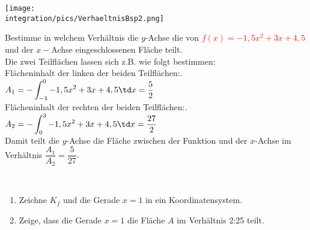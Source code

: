 \begin{minipage}{\textwidth}
	\begin{minipage}{.4\textwidth}
		\texttt{[image: \\integration/pics/VerhaeltnisBsp2.png]}
	\end{minipage}
	\begin{minipage}{.6\textwidth}\raggedright
		Bestimme in welchem Verhältnis die \(y\)-Achse die von \textcolor{red}{\(f(x)=-1,5x^2+3x+4,5\)} und der \(x-\)Achse eingeschlossenen Fläche teilt.\\
		\textcolor{loes}{Die zwei Teilflächen lassen sich z.B. wie folgt bestimmen:}\\
		\textcolor{loes}{Flächeninhalt der linken der beiden Teilflächen:}.\\
		\textcolor{loes}{\(\displaystyle A_1=-\int_{-1}^0 -1,5x^2+3x+4,5 \td x=\frac{5}{2}\)}\\
		\textcolor{loes}{Flächeninhalt der rechten der beiden Teilflächen:}.\\
		\textcolor{loes}{\(\displaystyle A_2=-\int_0^3 -1,5x^2+3x+4,5 \td x=\frac{27}{2}\)}\\
		\textcolor{loes}{Damit teilt die \(y\)-Achse die Fläche zwischen der Funktion und der \(x\)-Achse im Verhältnis \(\dfrac{A_1}{A_2}=\dfrac{5}{27}\)}.\\
	\end{minipage}
\end{minipage}\vspace{\baselineskip}\\
\newpage

\begin{Exercise}[title={\raggedright\normalfont Gegeben sind die Gerade \(x=1\) und die Funktion \(f(x)=-\frac{1}{2}x^2+3x\), ihr Schaubild sei \(K_f\) Die Fläche \(A\) sei die von \(K_f\) und der \(x\)-Achse eingeschlossene Fläche.}, label=verhaltnisFlaechenA1]
	\begin{enumerate}[label=\alph*)]
		\item Zeichne \(K_f\) und die Gerade \(x=1\) in ein Koordinatensystem.
		\item Zeige, dass die Gerade \(x=1\) die Fläche \(A\) im Verhältnis 2:25 teilt.
	\end{enumerate}
\end{Exercise}

